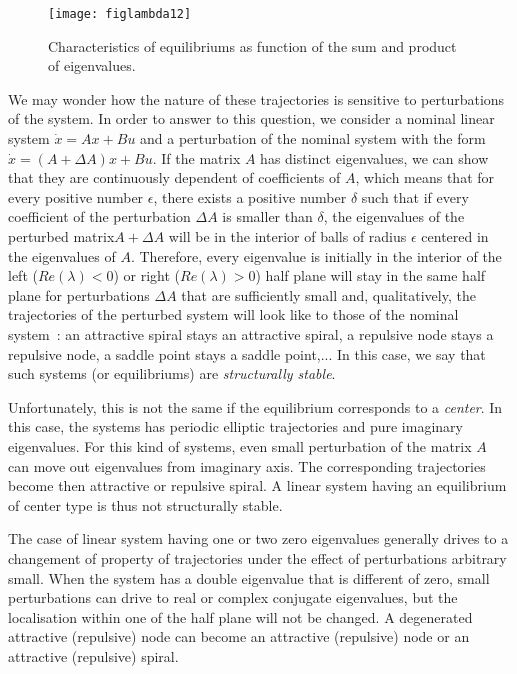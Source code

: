 \begin{figure}[htbp]
   \centering
   \texttt{[image: figlambda12]} 
   \caption{
   Characteristics of equilibriums as function of the sum and product of eigenvalues.}
   \label{fig:figlambda12}
\end{figure}

We may wonder how the nature of these trajectories is sensitive to perturbations of the system. In order to answer to this question, we consider a nominal linear system $\dot x=
A x+Bu$ and a perturbation of the nominal system with the form $\dot x= (A+\Delta A) x+Bu$. If the matrix $A$ has distinct eigenvalues, we can show that they are continuously dependent of coefficients of $A$, which means that for every positive number
$\epsilon$, there exists a positive number $\delta$ such that if every coefficient of the perturbation $\Delta A$ is smaller than $\delta$, the eigenvalues of the perturbed matrix$A+\Delta A$ will be in the interior of balls of radius $\epsilon$ centered in the eigenvalues of $A$. Therefore, every eigenvalue is initially in the interior of the left  ($Re(\lambda)<0$) or right 
($Re(\lambda)>0$) half plane will stay in the same half plane for perturbations 
$\Delta A$ that are sufficiently small and, qualitatively, the trajectories of the perturbed system will look like to those of the nominal system~:
an attractive spiral stays an attractive spiral, a repulsive node stays a repulsive node, a saddle point stays a saddle point,... In this case, we say that such systems (or equilibriums) are {\em
structurally stable}. 

Unfortunately, this is not the same if the equilibrium corresponds to a  {\em center}. In this case, the systems has periodic elliptic trajectories and  pure imaginary eigenvalues. For this kind of systems, even small perturbation of the matrix $A$ can move out eigenvalues from imaginary axis. The corresponding trajectories become then attractive or repulsive spiral. A linear system having an equilibrium of center type is thus not structurally stable.

The case of linear system having one or two zero eigenvalues generally drives to a changement of property of trajectories under the effect of perturbations arbitrary small. When the system has a double eigenvalue that is different of zero, small perturbations can drive to real or complex conjugate eigenvalues, but the localisation within one of the half plane will not be changed. A degenerated attractive (repulsive) node can become an attractive (repulsive) node or an attractive (repulsive) spiral.

